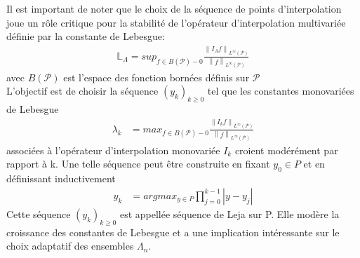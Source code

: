 \vspace{0.5cm}

Il est important de noter que le choix de la séquence de points d'interpolation joue un rôle critique
pour la stabilité de l'opérateur d'interpolation multivariée définie par la constante de Lebesgue:
\begin{align}
		\mathbb{L}_{\Lambda} = sup_{f \in B(\mathcal{P})-{0}} \frac{\left \| I_{\Lambda}f \right \|_{L^{\infty}(\mathcal{P})}}{\left \|f \right \|_{L^{\infty}(\mathcal{P})}}
\end{align}
avec $B(\mathcal{P})$ est l'espace des fonction bornées définis sur $\mathcal{P}$\\
L'objectif est de choisir la séquence $(y_k)_{k \geq 0}$ tel que les constantes monovariées de Lebesgue
\begin{align}
		\lambda_k & = max_{f \in B(\mathcal{P})-{0}} \frac{\left \| I_k f \right \|_{L^{\infty}(\mathcal{P})}}{\left \|f \right \|_{L^{\infty}(\mathcal{P})}}
\end{align}
associées à l'opérateur d'interpolation monovariée $I_k$ croient modérément par rapport à k.
Une telle séquence peut être construite en fixant $y_0 \in P$ et en définissant inductivement
\begin{align}
		y_k & = argmax_{y \in P} \prod_{j=0}^{k-1} \left | y - y_j \right |
\end{align}
Cette séquence $(y_k)_{k \geq 0}$ est appellée séquence de Leja \cite{Leja} sur P. Elle modère la croissance des constantes de Lebesgue
et a une implication intéressante sur le choix adaptatif des ensembles $\Lambda_n$.

